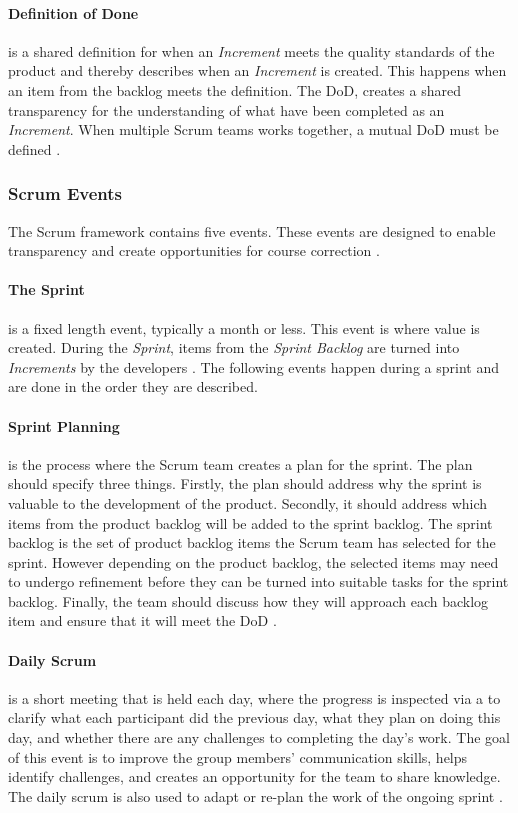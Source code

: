 \paragraph{Definition of Done} \label{par:definition-of-done}
is a shared definition for when an \emph{Increment} meets the quality standards of the product and thereby describes when an \emph{Increment} is created.
This happens when an item from the backlog meets the definition.
The DoD, creates a shared transparency for the understanding of what have been completed as an \emph{Increment}.
When multiple Scrum teams works together, a mutual DoD must be defined \cite{schwaber_sutherland_2022}.
\subsubsection{Scrum Events}
The Scrum framework contains five events. 
These events are designed to enable transparency and create opportunities for course correction \cite{schwaber_sutherland_2022}.

\paragraph{The Sprint}
is a fixed length event, typically a month or less.
This event is where value is created. 
During the \emph{Sprint}, items from the \emph{Sprint Backlog} are turned into \emph{Increments} by the developers \cite{schwaber_sutherland_2022}.
The following events happen during a sprint and are done in the order they are described. 

\paragraph{Sprint Planning}
is the process where the Scrum team creates a plan for the sprint.
The plan should specify three things. 
Firstly, the plan should address why the sprint is valuable to the development of the product. 
Secondly, it should address which items from the product backlog will be added to the sprint backlog. 
The sprint backlog is the set of product backlog items the Scrum team has selected for the sprint. However depending on the product backlog, the selected items may need to undergo refinement before they can be turned into suitable tasks for the sprint backlog. 
Finally, the team should discuss how they will approach each backlog item and ensure that it will meet the DoD \cite{schwaber_sutherland_2022}.

\paragraph{Daily Scrum}
is a short meeting that is held each day, where the progress is inspected via a  to clarify what each participant did the previous day, what they plan on doing this day, and whether there are any challenges to completing the day's work.
The goal of this event is to improve the group members' communication skills, helps identify challenges, and creates an opportunity for the team to share knowledge.
The daily scrum is also used to adapt or re-plan the work of the ongoing sprint \cite{schwaber_sutherland_2022}.

